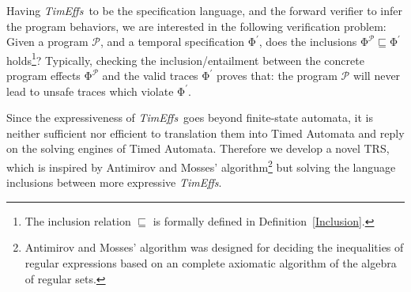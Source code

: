 \documentclass[acmsmall,10pt,review]{acmart}
\newcommand{\timedEffects}{\emph{TimEffs}}
\newcommand{\effect}{{\ensuremath{\mathrm{\Phi}}}}
\newcommand{\code}[1]{{\tt{\ensuremath{\m{#1}}}}}
\newcommand{\CONTAIN}{\sqsubseteq}
\newcommand{\m}{\mathit}
\newcommand\defref[1]{Definition~\textcolor{blue}{\ref{#1}}}
\begin{document}






Having \timedEffects\ to be  the specification language, 
and the forward verifier to infer the program behaviors, 
we are interested 
in the following verification problem: 
Given a program \code{\mathcal{P}},
and a temporal specification \code{\effect^{\prime}}, does the inclusions 
\code{\effect^{\mathcal{P}} \CONTAIN \effect^{\prime}} holds\footnote{The 
inclusion relation $\CONTAIN$ is formally defined in \defref{Inclusion}.}? Typically, 
checking the inclusion/entailment between the concrete program effects \code{\effect^{\mathcal{P}}} and the valid traces \code{\effect^{\prime}} proves that: the program \code{\mathcal{P}} will never lead to unsafe traces which violate \code{\effect^{\prime}}.

Since the expressiveness of \timedEffects\ goes beyond 
finite-state automata, it is neither sufficient nor efficient to 
 translation them 
into Timed Automata and reply on the solving engines of Timed Automata.
Therefore we 
develop a novel TRS, 
which  is inspired by Antimirov and Mosses’ algorithm\footnote{Antimirov and Mosses' 
algorithm was designed for deciding the inequalities of regular 
expressions based on an 
complete 
axiomatic algorithm of the algebra of regular sets.} \cite{DBLP:journals/tcs/AntimirovM95} but solving the 
language inclusions between more expressive \timedEffects.  

\end{document}
